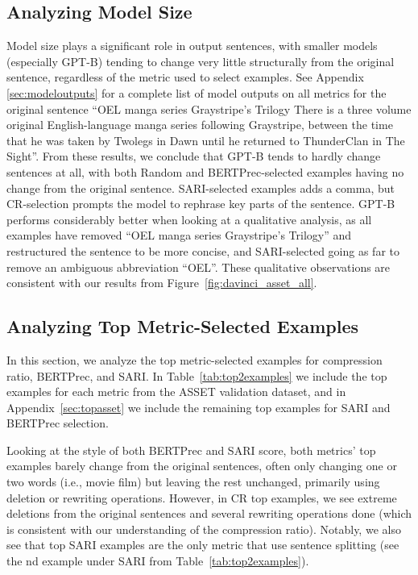 \documentclass[11pt]{article}
\begin{document}
\subsection{Analyzing Model Size}
Model size plays a significant role in output sentences, with smaller models (especially GPT-B) tending to change very little structurally from the original sentence, regardless of the metric used to select examples. See Appendix \ref{sec:modeloutputs} for a complete list of model outputs on all metrics for the original sentence ``OEL manga series Graystripe's Trilogy There is a three volume original English-language manga series following Graystripe, between the time that he was taken by Twolegs in Dawn until he returned to ThunderClan in The Sight''. From these results, we conclude that GPT-B tends to hardly change sentences at all, with both Random and BERTPrec-selected examples having no change from the original sentence. SARI-selected examples adds a comma, but CR-selection prompts the model to rephrase key parts of the sentence. GPT-B performs considerably better when looking at a qualitative analysis, as all examples have removed ``OEL manga series Graystripe's Trilogy'' and restructured the sentence to be more concise, and SARI-selected going as far to remove an ambiguous abbreviation ``OEL''. These qualitative observations are consistent with our results from Figure~\ref{fig:davinci_asset_all}.

\subsection{Analyzing Top Metric-Selected Examples}
In this section, we analyze the top metric-selected examples for compression ratio, BERTPrec, and SARI. In Table~\ref{tab:top2examples} we include the top  examples for each metric from the ASSET validation dataset, and in Appendix~\ref{sec:topasset} we include the remaining top  examples for SARI and BERTPrec selection. 

Looking at the style of both BERTPrec and SARI score, both metrics' top examples barely change from the original sentences, often only changing one or two words (i.e., movie  film) but leaving the rest unchanged, primarily using deletion or rewriting operations. However, in CR top examples, we see extreme deletions from the original sentences and several rewriting operations done (which is consistent with our understanding of the compression ratio). Notably, we also see that top SARI examples are the only metric that use sentence splitting (see the nd example under SARI from Table~\ref{tab:top2examples}). 
 
\end{document}

